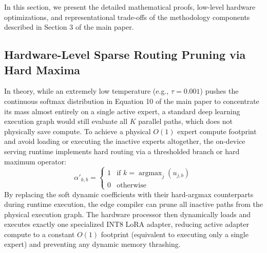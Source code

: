\documentclass{article}
\theoremstyle{plain}
\theoremstyle{definition}
\theoremstyle{remark}
\begin{document}
In this section, we present the detailed mathematical proofs, low-level hardware optimizations, and representational trade-offs of the methodology components described in Section 3 of the main paper.

\subsection{Hardware-Level Sparse Routing Pruning via Hard Maxima}
In theory, while an extremely low temperature (e.g., $\tau = 0.001$) pushes the continuous softmax distribution in Equation 10 of the main paper to concentrate its mass almost entirely on a single active expert, a standard deep learning execution graph would still evaluate all $K$ parallel paths, which does not physically save compute. To achieve a physical $O(1)$ expert compute footprint and avoid loading or executing the inactive experts altogether, the on-device serving runtime implements hard routing via a thresholded branch or hard maximum operator:
\begin{equation}
    \alpha'_{k, b} = \begin{cases} 1 & \text{if } k = \operatorname{argmax}_j(u_{j, b}) \\ 0 & \text{otherwise} \end{cases}
\end{equation}
By replacing the soft dynamic coefficients with their hard-argmax counterparts during runtime execution, the edge compiler can prune all inactive paths from the physical execution graph. The hardware processor then dynamically loads and executes exactly one specialized INT8 LoRA adapter, reducing active adapter compute to a constant $O(1)$ footprint (equivalent to executing only a single expert) and preventing any dynamic memory thrashing.
\end{document}
